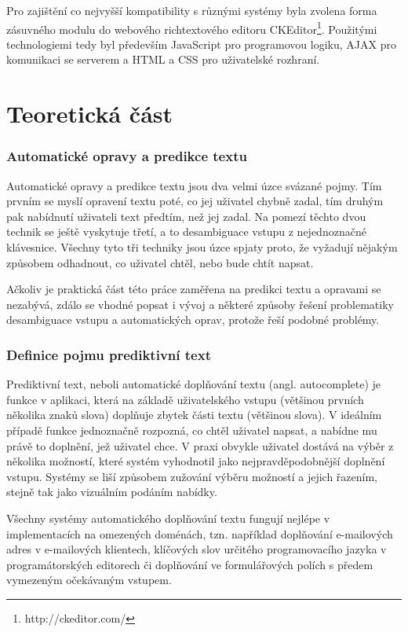 \documentclass[a4paper,11pt]{article}
\begin{document}
Pro zajištění co nejvyšší kompatibility s různými systémy byla zvolena forma zásuvného modulu do webového richtextového editoru CKEditor\footnote{http://ckeditor.com/}. Použitými technologiemi tedy byl především JavaScript pro programovou logiku, AJAX pro komunikaci se serverem a HTML a CSS pro uživatelské rozhraní.

\part{Teoretická část}

\section{Automatické opravy a predikce textu}

Automatické opravy a predikce textu jsou dva velmi úzce svázané pojmy. Tím prvním se myslí opravení textu poté, co jej uživatel chybně zadal, tím druhým pak nabídnutí uživateli text předtím, než jej zadal. Na pomezí těchto dvou technik se ještě vyskytuje třetí, a to desambiguace vstupu z nejednoznačné klávesnice. Všechny tyto tři techniky jsou úzce spjaty proto, že vyžadují nějakým způsobem odhadnout, co uživatel chtěl, nebo bude chtít napsat.

Ačkoliv je praktická část této práce zaměřena na predikci textu a opravami se nezabývá, zdálo se vhodné popsat i vývoj a některé způsoby řešení problematiky desambiguace vstupu a automatických oprav, protože řeší podobné problémy.

\section{Definice pojmu prediktivní text}

Prediktivní text, neboli automatické doplňování textu (angl. autocomplete) je funkce v aplikaci, která na základě uživatelského vstupu (většinou prvních několika znaků slova) doplňuje zbytek části textu (většinou slova). V ideálním případě funkce jednoznačně rozpozná, co chtěl uživatel napsat, a nabídne mu právě to doplnění, jež uživatel chce. V praxi obvykle uživatel dostává na výběr z několika možností, které systém vyhodnotil jako nejpravděpodobnější doplnění vstupu. Systémy se liší způsobem zužování výběru možností a jejich řazením, stejně tak jako vizuálním podáním nabídky.

Všechny systémy automatického doplňování textu fungují nejlépe v implementacích na omezených doménách, tzn. například doplňování e-mailových adres v e-mailových klientech, klíčových slov určitého programovacího jazyka v programátorských editorech či doplňování ve formulářových polích s předem vymezeným očekávaným vstupem. 
\end{document}
